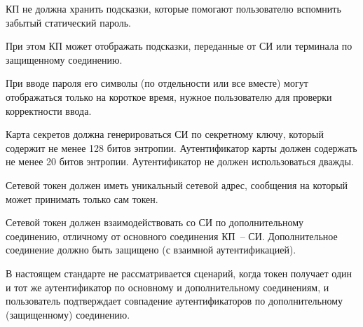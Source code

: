КП не должна хранить подсказки, которые помогают пользователю вспомнить забытый 
статический пароль.


\begin{note*}
При этом КП может отображать подсказки, переданные от СИ или терминала 
по защищенному соединению.
\end{note*}

При вводе пароля его символы (по отдельности или все вместе)
могут отображаться только на короткое время,
нужное пользователю для проверки корректности ввода.


Карта секретов должна генерироваться СИ по секретному ключу, который содержит 
не менее 128 битов энтропии.
%
Аутентификатор карты должен содержать не менее 20 битов энтропии. 
%
Аутентификатор не должен использоваться дважды. 



Сетевой токен должен иметь уникальный сетевой адрес,
сообщения на который может принимать только сам токен.

\begin{note*}
\end{note*}

Сетевой токен должен взаимодействовать со СИ по дополнительному соединению, 
отличному от основного соединения КП~-- СИ. Дополнительное соединение 
должно быть защищено (с взаимной аутентификацией).

\begin{note*}
В настоящем стандарте не рассматривается сценарий, когда токен получает
один и тот же аутентификатор по основному и дополнительному соединениям,
и пользователь подтверждает совпадение аутентификаторов по дополнительному 
(защищенному) соединению.
\end{note*}


